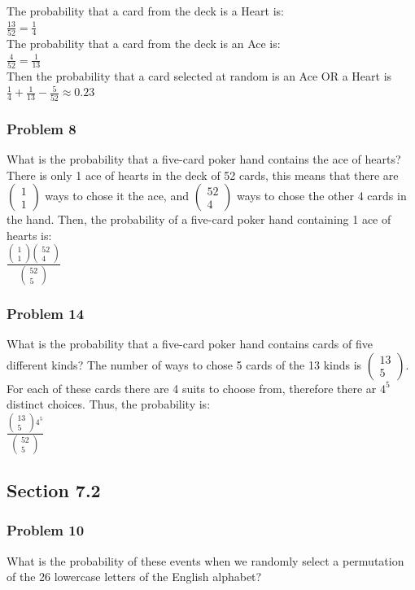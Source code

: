 \documentclass[fontsize=11pt]{scrartcl} %
\newcommand{\combination}[2]{
\begin{pmatrix}#1\\#2\end{pmatrix}
}
\begin{document}
The probability that a card from the deck is a Heart is:\\ $\frac{13}{52} = \frac{1}{4}$\\

The probability that a card from the deck is an Ace is: \\ $\frac{4}{52} = \frac{1}{13}$\\

Then the probability that a card selected at random is an Ace OR a Heart is\\ $\frac{1}{4} + \frac{1}{13} - \frac{5}{52} \approx 0.23$

\subsubsection*{Problem 8}
What is the probability that a five-card poker hand contains the ace of hearts?
There is only 1 ace of hearts in the deck of 52 cards, this means that there are $\combination{1}{1}$ ways to chose it the ace, and $\combination{52}{4}$ ways to chose the other 4 cards in the hand. Then, the probability of a five-card poker hand containing 1 ace of hearts is:\\
$\frac{\combination{1}{1}\combination{52}{4}}{\combination{52}{5}}$\\

\subsubsection*{Problem 14}
What is the probability that a five-card poker hand contains cards of five different kinds?
The number of ways to chose 5 cards of the 13 kinds is $\combination{13}{5}$. For each of these cards there are 4 suits to choose from, therefore there ar $4^5$ distinct choices. Thus, the probability is:\\
$\frac{\combination{13}{5}4^5}{\combination{52}{5}}$\\
 
 
\subsection*{Section 7.2}
\subsubsection*{Problem 10}
What is the probability of these events when we randomly select a permutation of the 26 lowercase letters of the English alphabet?\\
\end{document}
